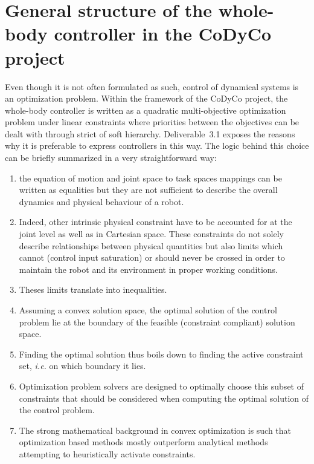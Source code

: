 \documentclass[12pt,a4paper,twoside]{article}
\begin{document}
\section{General structure of the whole-body controller in the CoDyCo project}

Even though it is not often formulated as such, control of dynamical systems is an optimization problem. Within the framework of the CoDyCo project, the whole-body controller is written as a quadratic multi-objective optimization problem under linear constraints where priorities between the objectives can be dealt with through strict of soft hierarchy. Deliverable~3.1 \cite{deliverable31} exposes the reasons why it is preferable to express controllers in this way. The logic behind this choice can be briefly summarized in a very straightforward way:
\begin{enumerate}
\item the equation of motion and joint space to task spaces mappings can be written as equalities but they are not sufficient to describe the overall dynamics and physical behaviour of a robot.
\item Indeed, other intrinsic physical constraint have to be accounted for at the joint level as well as in Cartesian space. These constraints do not solely describe relationships between physical quantities but also limits which cannot (control input saturation) or should never be crossed in order to maintain the robot and its environment in proper working conditions.
\item Theses limits translate into inequalities.
\item Assuming a convex solution space, the optimal solution of the control problem lie at the boundary of the feasible (constraint compliant) solution space.
\item Finding the optimal solution thus boils down to finding the active constraint set, \textit{i.e.} on which boundary it lies.
\item Optimization problem solvers are designed to optimally choose this subset of constraints that should be considered when computing the optimal solution of the control problem.
\item The strong mathematical background in convex optimization is such that optimization based methods mostly outperform analytical methods attempting to heuristically activate constraints.
\end{enumerate}
\end{document}
